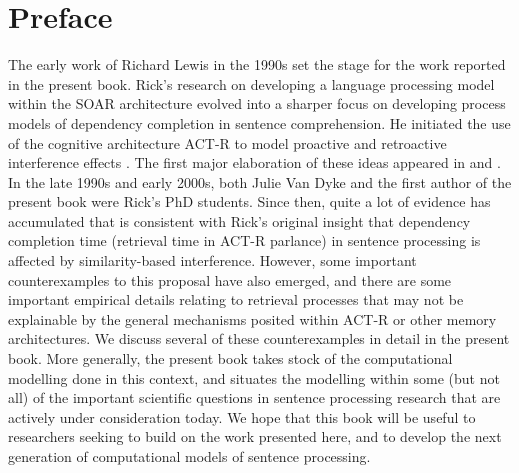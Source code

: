 
\chapter*{Preface}


The early work of Richard Lewis in the 1990s set the stage for the work reported in the present book. Rick's research on developing a language processing model within the SOAR  architecture  \citep{lewis:phd}  evolved into a sharper focus on developing process models of dependency completion in sentence comprehension. He initiated the use of the cognitive architecture ACT-R to model proactive and retroactive interference effects \citep{lewis:magical}.  The first major elaboration of these ideas appeared in \cite{LewisVasishth2005} and \cite{LewisVasishthVanDyke2006}. In the late 1990s and early 2000s, both Julie Van Dyke and the first author of the present book were Rick's PhD students. Since then, quite a lot of evidence has accumulated that is consistent with Rick's original insight  that dependency completion time (retrieval time in ACT-R parlance) in sentence processing is affected by similarity-based interference. However, some important counterexamples to this proposal have also emerged, and there are some important empirical details relating to retrieval processes that may not be explainable by the general mechanisms posited within ACT-R \citep{AndersonEtAl2004} or other memory architectures. We discuss several of these counterexamples in detail in the present book. More generally, the present book takes stock of the computational modelling done in this context, and situates the modelling within some (but not all) of the important scientific questions in sentence processing research that are actively under consideration today. We hope that this book will be useful to researchers seeking to build on the work presented here, and to develop the next generation of computational models of sentence processing.
 
